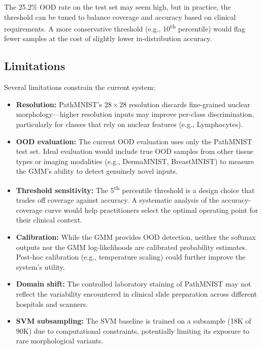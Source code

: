 \documentclass{article}
\begin{document}
The 25.2\% OOD rate on the test set may seem high, but in practice, the threshold can be tuned to balance coverage and accuracy based on clinical requirements. A more conservative threshold (e.g., 10\textsuperscript{th} percentile) would flag fewer samples at the cost of slightly lower in-distribution accuracy.

\subsection{Limitations}

Several limitations constrain the current system:

\begin{itemize}
    \item \textbf{Resolution:} PathMNIST's $28 \times 28$ resolution discards fine-grained nuclear morphology---higher resolution inputs may improve per-class discrimination, particularly for classes that rely on nuclear features (e.g., Lymphocytes).

    \item \textbf{OOD evaluation:} The current OOD evaluation uses only the PathMNIST test set. Ideal evaluation would include true OOD samples from other tissue types or imaging modalities (e.g., DermaMNIST, BreastMNIST) to measure the GMM's ability to detect genuinely novel inputs.

    \item \textbf{Threshold sensitivity:} The 5\textsuperscript{th} percentile threshold is a design choice that trades off coverage against accuracy. A systematic analysis of the accuracy-coverage curve would help practitioners select the optimal operating point for their clinical context.

    \item \textbf{Calibration:} While the GMM provides OOD detection, neither the softmax outputs nor the GMM log-likelihoods are calibrated probability estimates. Post-hoc calibration (e.g., temperature scaling) could further improve the system's utility.

    \item \textbf{Domain shift:} The controlled laboratory staining of PathMNIST may not reflect the variability encountered in clinical slide preparation across different hospitals and scanners.

    \item \textbf{SVM subsampling:} The SVM baseline is trained on a subsample (18K of 90K) due to computational constraints, potentially limiting its exposure to rare morphological variants.
\end{itemize}
\end{document}

